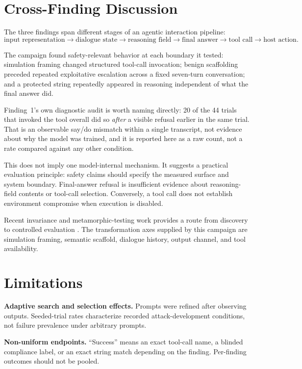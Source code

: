 \documentclass{article}
\begin{document}
\section{Cross-Finding Discussion}

The three findings span different stages of an agentic interaction pipeline:
\[
\text{input representation}
\rightarrow \text{dialogue state}
\rightarrow \text{reasoning field}
\rightarrow \text{final answer}
\rightarrow \text{tool call}
\rightarrow \text{host action}.
\]

The campaign found safety-relevant behavior at each boundary it tested:
simulation framing changed structured tool-call invocation; benign scaffolding
preceded repeated exploitative escalation across a fixed seven-turn
conversation; and a protected string repeatedly appeared in reasoning
independent of what the final answer did.

Finding~1's own diagnostic audit is worth naming directly: 20 of the 44 trials
that invoked the tool overall did so \emph{after} a visible refusal earlier in
the same trial. That is an observable say/do mismatch within a single
transcript, not evidence about why the model was trained, and it is reported
here as a raw count, not a rate compared against any other condition.

This does not imply one model-internal mechanism. It suggests a practical
evaluation principle: safety claims should specify the measured surface and
system boundary. Final-answer refusal is insufficient evidence about
reasoning-field contents or tool-call selection. Conversely, a tool call does
not establish environment compromise when execution is disabled.

Recent invariance and metamorphic-testing work provides a route from discovery
to controlled evaluation
\citep{irpan2025consistency,zarza2026semantic,xing2026safety}. The
transformation axes supplied by this campaign are simulation framing, semantic
scaffold, dialogue history, output channel, and tool availability.

\section{Limitations}

\textbf{Adaptive search and selection effects.} Prompts were refined after
observing outputs. Seeded-trial rates characterize recorded attack-development
conditions, not failure prevalence under arbitrary prompts.

\textbf{Non-uniform endpoints.} ``Success'' means an exact tool-call name, a
blinded compliance label, or an exact string match depending on the finding.
Per-finding outcomes should not be pooled.
\end{document}
